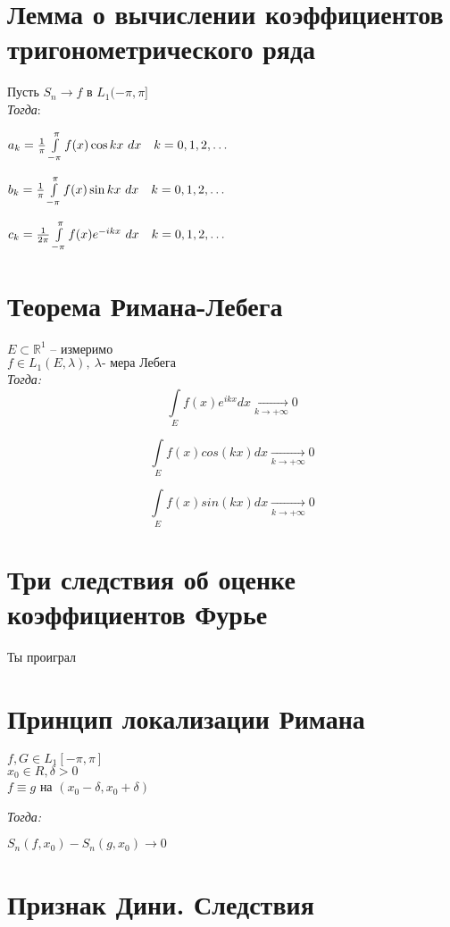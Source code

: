 \documentclass[paper=a4, fontsize=14pt]{report}
\begin{document}
    \section{Лемма о вычислении коэффициентов тригонометрического ряда}

    Пусть $S_n \rightarrow f$ в $L_1(-\pi, \pi]$\\

    \emph{Тогда}:

    $a_k = \frac{1}{\pi}\int\limits_{-\pi}^{\pi}f(x)\cos kx\ dx \quad k = 0, 1, 2, \mathellipsis$

    $b_k = \frac{1}{\pi}\int\limits_{-\pi}^{\pi}f(x)\sin kx\ dx \quad k = 0, 1, 2, \mathellipsis$

    $c_k = \frac{1}{2\pi}\int\limits_{-\pi}^{\pi}f(x)e^{-ikx}\ dx \quad k = 0, 1, 2, \mathellipsis$

    \section{Теорема Римана-Лебега}
    $E \subset \mathds{R}^1$ -- измеримо\\ $f \in L_1(E, \lambda), ~ \lambda \text{- мера Лебега}$ \\
    \emph{Тогда:}
    $$\int\limits_{E}f(x)e^{ikx}dx \xrightarrow[k \to +\infty]{} 0$$

    $$\int\limits_{E}f(x)cos(kx)dx \xrightarrow[k \to +\infty]{} 0$$

    $$\int\limits_{E}f(x)sin(kx)dx \xrightarrow[k \to +\infty]{} 0$$
    \section{Три следствия об оценке коэффициентов Фурье}
    Ты проиграл

    \section{Принцип локализации Римана}

    $ f, G \in L_1[-\pi, \pi] $\\
    $ x_0 \in R, \delta > 0 $\\
    $ f \equiv g $ на $ (x_0 - \delta, x_0 + \delta) $

    \emph{Тогда:}

    $ S_n(f, x_0) - S_n(g, x_0) \to 0 $

    \section{Признак Дини. Следствия}
\end{document}
